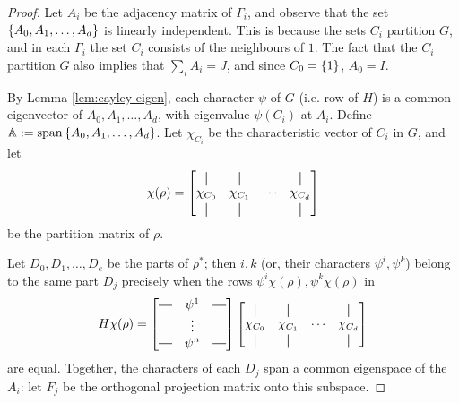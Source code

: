 \documentclass{report}
\newcommand*{\vertbar}{\rule[-1ex]{0.5pt}{2.5ex}}
\newcommand*{\horzbar}{\rule[.5ex]{2.5ex}{0.5pt}}
\newcommand{\BMA}{\mathbb{A}}
\begin{document}
    \begin{proof}
      Let $A_i$ be the adjacency matrix of $\Gamma_i$,
      and observe that the set $\left\lbrace A_0, A_1, \ldots, A_d \right\rbrace$ is linearly
      independent.  This is because the sets $C_i$ partition $G$, and in each
      $\Gamma_i$ the set $C_i$ consists of the neighbours of $1$.
      The fact that the $C_i$ partition $G$ also implies that $\sum_i A_i = J$,
      and since $C_0 = \left\lbrace 1 \right\rbrace$, $A_0 = I$.

      By Lemma \ref{lem:cayley-eigen}, each character $\psi$ of $G$ (i.e. row of $H$)
      is a common eigenvector of $A_0, A_1, \ldots, A_d$,
      with eigenvalue $\psi(C_i)$ at $A_i$.
      Define $\BMA := \Span\set{A_0, A_1, \ldots, A_d}$.
      Let $\chi_{C_i}$ be the characteristic vector of $C_i$ in $G$,
      and let
      \begin{equation}\label{eqn:part-mat-rho}
        \chi(\rho) =
        \begin{bmatrix}
          \vertbar   & \vertbar   &        & \vertbar   \\
          \chi_{C_0} & \chi_{C_1} & \cdots & \chi_{C_d} \\
          \vertbar   & \vertbar   &        & \vertbar   \\
        \end{bmatrix}
      \end{equation}
      be the partition matrix of $\rho$.

      Let $D_0, D_1, \ldots, D_e$ be the parts of $\rho^*$;
      then $i, k$ (or, their characters $\psi^i, \psi^k$)
      belong to the same part $D_j$ precisely when the rows
      $\psi^i \chi(\rho), \psi^k \chi(\rho)$ in
      \begin{equation}
        H \chi(\rho) =
        \begin{bmatrix}
          \horzbar & \psi^1 & \horzbar \\
                   & \vdots &          \\
          \horzbar & \psi^n & \horzbar \\
        \end{bmatrix}
        \begin{bmatrix}
          \vertbar   & \vertbar   &        & \vertbar   \\
          \chi_{C_0} & \chi_{C_1} & \cdots & \chi_{C_d} \\
          \vertbar   & \vertbar   &        & \vertbar   \\
        \end{bmatrix}
      \end{equation}
      are equal.
      Together, the characters of each $D_j$ span a common eigenspace of the
      $A_i$: let $F_j$ be the orthogonal projection matrix onto this subspace.


\end{proof}
\end{document}
